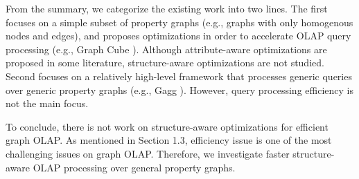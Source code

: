 	
	From the summary, we categorize the existing work into two lines. The first focuses on a simple subset of property graphs (e.g., graphs with only homogenous nodes and edges), and proposes optimizations in order to accelerate OLAP query processing (e.g., Graph Cube \cite{sigmod11_ZhaoLXH11}). Although attribute-aware optimizations are proposed in some literature, structure-aware optimizations are not studied. Second focuses on a relatively high-level framework that processes generic queries over generic property graphs (e.g., Gagg \cite{iswc15_Maali:2015aa}). However, query processing efficiency is not the main focus.
	
	To conclude, there is not work on structure-aware optimizations for efficient graph OLAP. As mentioned in Section 1.3, efficiency issue is one of the most challenging issues on graph OLAP. Therefore, we investigate faster structure-aware OLAP processing over general property graphs.
	
	
	
	
	
